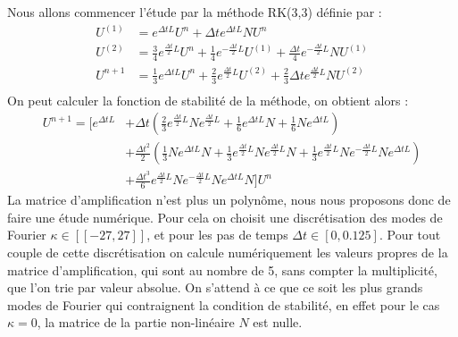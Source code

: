 Nous allons commencer l'étude par la méthode RK(3,3) définie par :
$$
  \begin{aligned}
    U^{(1)} &= e^{\Delta tL}U^n + \Delta te^{\Delta tL}NU^n \\
    U^{(2)} &= \frac{3}{4}e^{\frac{\Delta t}{2}L}U^n + \frac{1}{4}e^{-\frac{\Delta t}{2}L}U^{(1)} + \frac{\Delta t}{4}e^{-\frac{\Delta t}{2}L}NU^{(1)} \\
    U^{n+1} &= \frac{1}{3}e^{\Delta tL}U^n + \frac{2}{3}e^{\frac{\Delta t}{2}L}U^{(2)} + \frac{2}{3}\Delta te^{\frac{\Delta t}{2}L}NU^{(2)} \\
  \end{aligned}
$$
On peut calculer la fonction de stabilité de la méthode, on obtient alors :
$$
  \begin{aligned}
    U^{n+1} = \Big[ e^{\Delta tL} &+ \Delta t\left(\frac{2}{3}e^{\frac{\Delta t}{2}L}Ne^{\frac{\Delta t}{2}L}+\frac{1}{6}e^{\Delta tL}N + \frac{1}{6}Ne^{\Delta tL}\right) \\
    & + \frac{\Delta t^2}{2}\left(\frac{1}{3}Ne^{\Delta tL}N + \frac{1}{3}e^{\frac{\Delta t}{2}L}Ne^{\frac{\Delta t}{2}L}N + \frac{1}{3} e^{\frac{\Delta t}{2}L}Ne^{-\frac{\Delta t}{2}L}Ne^{\Delta tL} \right) \\
    & + \frac{\Delta t^3}{6}e^{\frac{\Delta t}{2}L}Ne^{-\frac{\Delta t}{2}L}Ne^{\Delta tL}N \Big]U^n
  \end{aligned}
$$
La matrice d'amplification n'est plus un polynôme, nous nous proposons donc de faire une étude numérique. Pour cela on choisit une discrétisation des modes de Fourier $\kappa\in[\![-27,27]\!]$, et pour les pas de temps $\Delta t\in[0,0.125]$. Pour tout couple de cette discrétisation on calcule numériquement les valeurs propres de la matrice d'amplification, qui sont au nombre de 5, sans compter la multiplicité, que l'on trie par valeur absolue. On s'attend à ce que ce soit les plus grands modes de Fourier qui contraignent la condition de stabilité, en effet pour le cas $\kappa=0$, la matrice de la partie non-linéaire $N$ est nulle.

